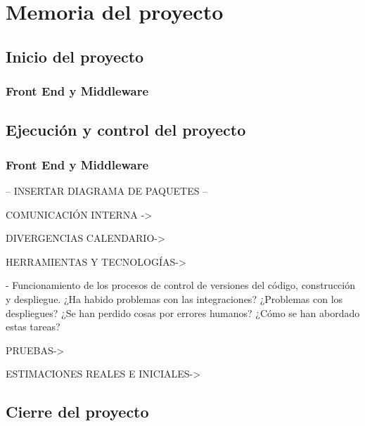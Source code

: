 \section{Memoria del proyecto}
\label{memoria}

\subsection{Inicio del proyecto}

\subsubsection{Front End y Middleware}



\subsection{Ejecución y control del proyecto}

\subsubsection{Front End y Middleware}

-- INSERTAR DIAGRAMA DE PAQUETES --

COMUNICACIÓN INTERNA ->



DIVERGENCIAS CALENDARIO->


HERRAMIENTAS Y TECNOLOGÍAS->


- Funcionamiento de los procesos de control de versiones del código, construcción y despliegue. ¿Ha habido problemas con las integraciones? ¿Problemas con los despliegues? ¿Se han perdido cosas por errores humanos? ¿Cómo se han abordado estas tareas?




PRUEBAS->



ESTIMACIONES REALES E INICIALES->




\subsection{Cierre del proyecto}